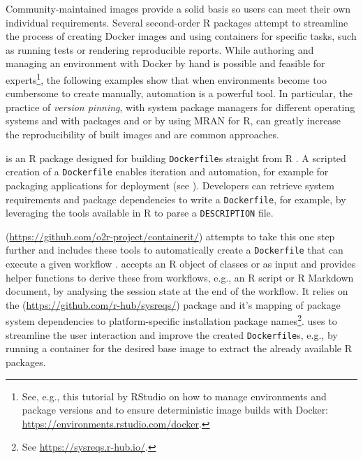 Community-maintained images provide a solid basis so users can meet
their own individual requirements. Several second-order R packages
attempt to streamline the process of creating Docker images and using
containers for specific tasks, such as running tests or rendering
reproducible reports. While authoring and managing an environment with
Docker by hand is possible and feasible for
experts\footnote{See, e.g., this tutorial by RStudio on how to manage environments and package versions and to ensure deterministic image builds with Docker: \href{https://environments.rstudio.com/docker}{https://environments.rstudio.com/docker}.},
the following examples show that when environments become too cumbersome
to create manually, automation is a powerful tool. In particular, the
practice of \emph{version pinning}, with system package managers for
different operating systems and with packages  and
 or by using MRAN for R, can greatly increase the
reproducibility of built images and are common approaches.

\textbf{} is an R package designed for building
\texttt{Dockerfile}s straight from R \citep{cran_dockerfiler}. A
scripted creation of a \texttt{Dockerfile} enables iteration and
automation, for example for packaging applications for deployment (see
). Developers can retrieve system requirements and
package dependencies to write a \texttt{Dockerfile}, for example, by
leveraging the tools available in R to parse a \texttt{DESCRIPTION}
file.

\textbf{}
(\url{https://github.com/o2r-project/containerit/}) attempts to take
this one step further and includes these tools to automatically create a
\texttt{Dockerfile} that can execute a given workflow
\citep{nust_containerit_2019}.  accepts an R object of
classes  or  as input and
provides helper functions to derive these from workflows, e.g., an R
script or R Markdown document, by analysing the session state at the end
of the workflow. It relies on the 
(\url{https://github.com/r-hub/sysreqs/}) package and it's mapping of
package system dependencies to platform-specific installation package
names\footnote{See \href{https://sysreqs.r-hub.io/}{https://sysreqs.r-hub.io/}.}.
 uses  to streamline the user
interaction and improve the created \texttt{Dockerfile}s, e.g., by
running a container for the desired base image to extract the already
available R packages.


